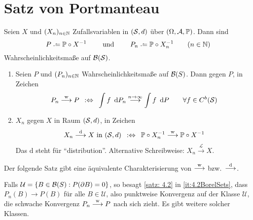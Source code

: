 
\section{Satz von Portmanteau}

Seien $X$ und $(X_n)_{n \in \N}$ Zufallsvariablen in $(\S,d)$ über $(\Omega,\A,\P)$.
Dann sind
\begin{equation*}
	P \defeq \P \circ X^{-1} \qquad \und \qquad P_n \defeq \P \circ X_n^{-1} \qquad (n \in \N)
\end{equation*}
Wahrscheinlichkeitsmaße auf $\B(\S)$.

\begin{definition} \label{definition: 4.1}
	\begin{enumerate}[label=(\arabic*)]
		\item \label{it: 4.1Pweak} Seien $P$ und $(P_n)_{n \in \N}$ Wahrscheinlichkeitsmaße auf $\B(S)$.
		Dann  gegen $P$, in Zeichen
		\begin{equation*}
			P_n \weakto P \defequiv \int f \diffskip{P_n} \ntoinf \int f \diffskip P \qquad \forall f \in C^b(\S)
		\end{equation*}
		\item \label{it: 4.1Xweak} $X_n$  gegen $X$ in Raum $(\S,d)$, in Zeichen
			\begin{align*}
				X_n \distto X \text{ in } (\S,d) \defequiv \P \circ X_n^{-1} \weakto \P \circ X^{-1}
			\end{align*}
			Das $\text{d}$ steht für \enquote{distribution}. Alternative Schreibweise: $X_n \overset{\mathcal{L}}{\longrightarrow} X$.
	\end{enumerate}
\end{definition}

Der folgende Satz gibt eine äquivalente Charakterisierung von $\weakto$ bzw.\ $\distto$.



Falls $\mathcal{U} = \menge{B \in \B(S) : P(\rand{B}) = 0}$, so besagt \cref{satz: 4.2} in \cref{it:4.2BorelSets}, dass $P_n(B) \to P(B)$ für alle $B \in \mathcal{U}$, also punktweise Konvergenz auf der Klasse $\mathcal{U}$, die schwache Konvergenz $P_n \weakto P$ nach sich zieht.
Es gibt weitere solcher Klassen.

